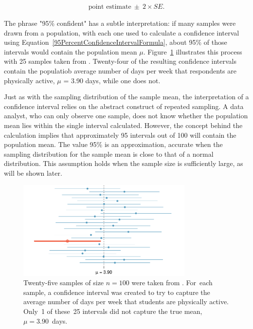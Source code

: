 \begin{spacing}{1.5}
\begin{align}
\text{point estimate}\ \pm\ 2\times SE.
\label{95PercentConfidenceIntervalFormula}
\end{align}

The phrase "95\% confident" has a subtle interpretation: if many samples were drawn from a population, with each one used to calculate a confidence interval using Equation~\ref{95PercentConfidenceIntervalFormula}, about 95\% of those intervals would contain the population mean $\mu$. Figure~\ref{95PercentConfidenceInterval} illustrates this process with 25 samples taken from . Twenty-four of the resulting confidence intervals contain the populatiob average number of days per week that respondents are physically active, $\mu$ = 3.90 days, while one does not. 

Just as with the sampling distribution of the sample mean, the interpretation of a confidence interval relies on the abstract construct of repeated sampling. A data analyst, who can only observe one sample, does not know whether the population mean lies within the single interval calculated. However, the concept behind the calculation implies that approximately 95 intervals out of 100 will contain the population mean. The value 95\% is an approximation, accurate when the sampling distribution for the sample mean is close to that of a normal distribution. This assumption holds when the sample size is sufficiently large, as will be shown later.

\begin{figure}[hht]
   \centering
   \includegraphics[width=0.78\textwidth]
{ch_inference_foundations_oi_biostat/figures/95PercentConfidenceInterval/95PercentConfidenceInterval}
   \caption{Twenty-five samples of size $n=100$ were taken from . For~each sample, a confidence interval was created to try to capture the average number of days per week that students are physically active. Only~1 of these~25 intervals did not capture the true mean, $\mu = 3.90$~days.}
   \label{95PercentConfidenceInterval}
\end{figure}


\end{spacing}
